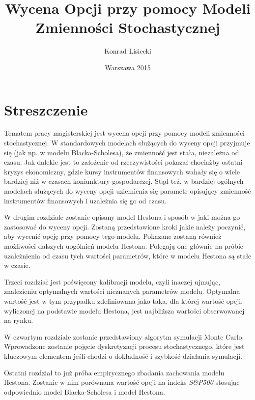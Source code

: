 \documentclass{pracamgr}
\author{Konrad Lisiecki}
\title{Wycena Opcji przy pomocy Modeli Zmienności Stochastycznej}
\date{Warszawa 2015}
\begin{document}
\maketitle
\nocite{book-full} 

\chapter*{Streszczenie} 


Tematem pracy magisterskiej jest wycena opcji przy pomocy modeli zmienności stochastycznej. 
W standardowych modelach służących do wyceny opcji przyjmuje się (jak np. w modelu 
Blacka-Scholesa), że zmienność jest stała, niezależna od czasu. 
Jak dalekie jest to założenie od rzeczywistości pokazał chociażby ostatni kryzys 
ekonomiczny, gdzie kursy instrumentów finansowych wahały się o wiele bardziej niż w czasach
koniunktury gospodarczej. Stąd też, w bardziej ogólnych modelach służących do wyceny opcji uziemienia się parametr opisujący zmienność instrumentów finansowych i uzależnia się go od czasu. 

W drugim rozdziale zostanie opisany model Hestona i sposób w jaki można go zastosować do wyceny opcji. 
Zostaną przedstawione kroki jakie należy poczynić, aby wycenić opcję przy pomocy tego modelu.
Pokazane zostaną również możliwości dalszych uogólnień modelu Hestona. 
Polegają one głównie na próbie uzależnienia od czasu tych wartości parametrów, które w 
modelu Hestona są stałe w czasie.

Trzeci rozdział jest poświęcony kalibracji modelu, czyli inaczej ujmując, znalezieniu 
optymalnych wartości nieznanych parametrów modelu. Optymalna wartość jest w tym przypadku zdefiniowana
jako taka, dla której wartość opcji, wyliczonej na podstawie modelu Hestona, jest najbliższa wartości 
obserwowanej na rynku.

W czwartym rozdziale zostanie przedstawiony algorytm symulacji Monte Carlo. 
Wprowadzone zostanie pojęcie dyskretyzacji procesu stochastycznego, które jest kluczowym elementem
jeśli chodzi o dokładność i szybkość działania symulacji. 


Ostatni rozdział to już próba empirycznego zbadania zachowania modelu Hestona. Zostanie w nim porównana
wartość opcji na indeks \textit{S\&P500} stosując odpowiednio model Blacka-Scholesa i model Hestona.
\end{document}
